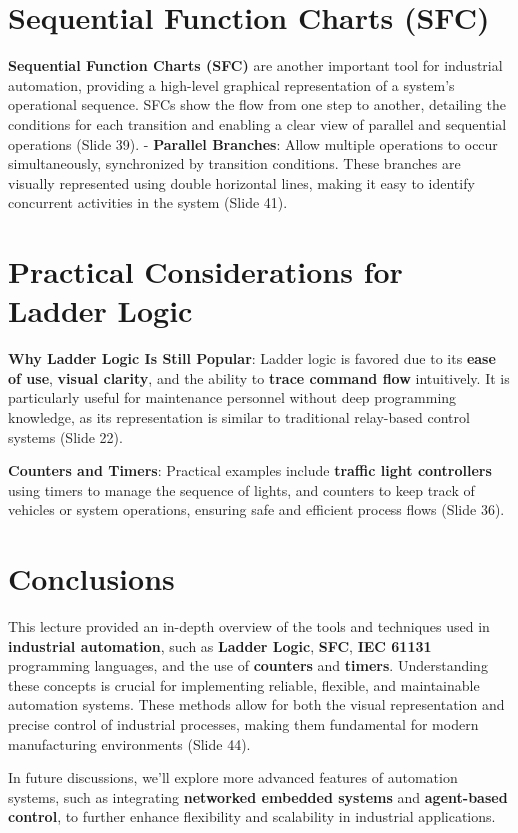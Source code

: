 \documentclass[
  14pt,
  a4paper,
  numbers=noendperiod,
  headinclude=true,
  footinclude=true,
  DIV=calc]{scrreprt}
\begin{document}
\section{Sequential Function Charts
(SFC)}\label{sequential-function-charts-sfc}

\textbf{Sequential Function Charts (SFC)} are another important tool for
industrial automation, providing a high-level graphical representation
of a system's operational sequence. SFCs show the flow from one step to
another, detailing the conditions for each transition and enabling a
clear view of parallel and sequential operations (Slide 39). -
\textbf{Parallel Branches}: Allow multiple operations to occur
simultaneously, synchronized by transition conditions. These branches
are visually represented using double horizontal lines, making it easy
to identify concurrent activities in the system (Slide 41).

\section{Practical Considerations for Ladder
Logic}\label{practical-considerations-for-ladder-logic}

\textbf{Why Ladder Logic Is Still Popular}: Ladder logic is favored due
to its \textbf{ease of use}, \textbf{visual clarity}, and the ability to
\textbf{trace command flow} intuitively. It is particularly useful for
maintenance personnel without deep programming knowledge, as its
representation is similar to traditional relay-based control systems
(Slide 22).

\textbf{Counters and Timers}: Practical examples include \textbf{traffic
light controllers} using timers to manage the sequence of lights, and
counters to keep track of vehicles or system operations, ensuring safe
and efficient process flows (Slide 36).

\section{Conclusions}\label{conclusions}

This lecture provided an in-depth overview of the tools and techniques
used in \textbf{industrial automation}, such as \textbf{Ladder Logic},
\textbf{SFC}, \textbf{IEC 61131} programming languages, and the use of
\textbf{counters} and \textbf{timers}. Understanding these concepts is
crucial for implementing reliable, flexible, and maintainable automation
systems. These methods allow for both the visual representation and
precise control of industrial processes, making them fundamental for
modern manufacturing environments (Slide 44).

In future discussions, we'll explore more advanced features of
automation systems, such as integrating \textbf{networked embedded
systems} and \textbf{agent-based control}, to further enhance
flexibility and scalability in industrial applications.
\end{document}
